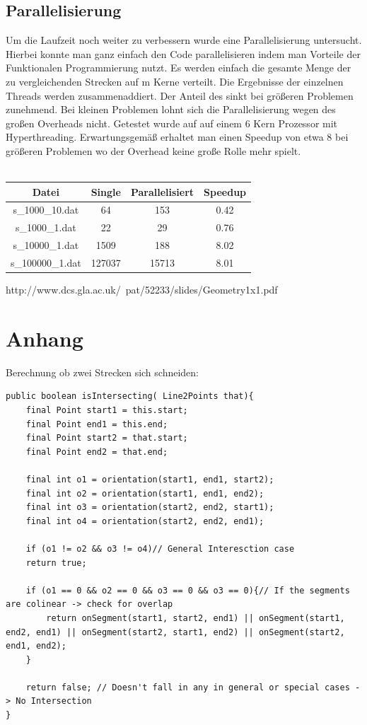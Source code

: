 \documentclass[conference]{IEEEtran}
\begin{document}
\subsection{Parallelisierung}
Um die Laufzeit noch weiter zu verbessern wurde eine Parallelisierung untersucht.\\
Hierbei konnte man ganz einfach den Code parallelisieren indem man Vorteile der Funktionalen Programmierung nutzt. Es werden einfach die gesamte Menge der zu vergleichenden Strecken auf m Kerne verteilt. Die Ergebnisse der einzelnen Threads werden zusammenaddiert. Der Anteil des sinkt bei größeren Problemen zunehmend. Bei kleinen Problemen lohnt sich die Parallelisierung wegen des großen Overheads nicht. Getestet wurde auf auf einem 6 Kern Prozessor mit Hyperthreading. Erwartungsgemäß erhaltet man einen Speedup von etwa 8 bei größeren Problemen wo der Overhead keine große Rolle mehr spielt.\\
\\
\begin{tabular}{|c|c|c|c|}
	\hline
	Datei & Single & Parallelisiert & Speedup\\
	\hline
	s\_1000\_10.dat & 64 & 153 & 0.42 \\
	\hline
	s\_1000\_1.dat & 22 & 29 & 0.76\\
	\hline
	s\_10000\_1.dat & 1509 & 188 & 8.02\\
	\hline
	s\_100000\_1.dat & 127037 & 15713 &  8.01\\
	\hline
\end{tabular}
\begin{thebibliography}{00}
	http://www.dcs.gla.ac.uk/~pat/52233/slides/Geometry1x1.pdf
\end{thebibliography}

\section{Anhang}

Berechnung ob zwei Strecken sich schneiden:
\begin{lstlisting}
public boolean isIntersecting( Line2Points that){
	final Point start1 = this.start;
	final Point end1 = this.end;
	final Point start2 = that.start;
	final Point end2 = that.end;
	
	final int o1 = orientation(start1, end1, start2);
	final int o2 = orientation(start1, end1, end2);
	final int o3 = orientation(start2, end2, start1);
	final int o4 = orientation(start2, end2, end1);
	
	if (o1 != o2 && o3 != o4)// General Interesction case
	return true;
	
	if (o1 == 0 && o2 == 0 && o3 == 0 && o3 == 0){// If the segments are colinear -> check for overlap
		return onSegment(start1, start2, end1) || onSegment(start1, end2, end1) || onSegment(start2, start1, end2) || onSegment(start2, end1, end2);
	}
	
	return false; // Doesn't fall in any in general or special cases -> No Intersection
}
\end{lstlisting}
\end{document}
